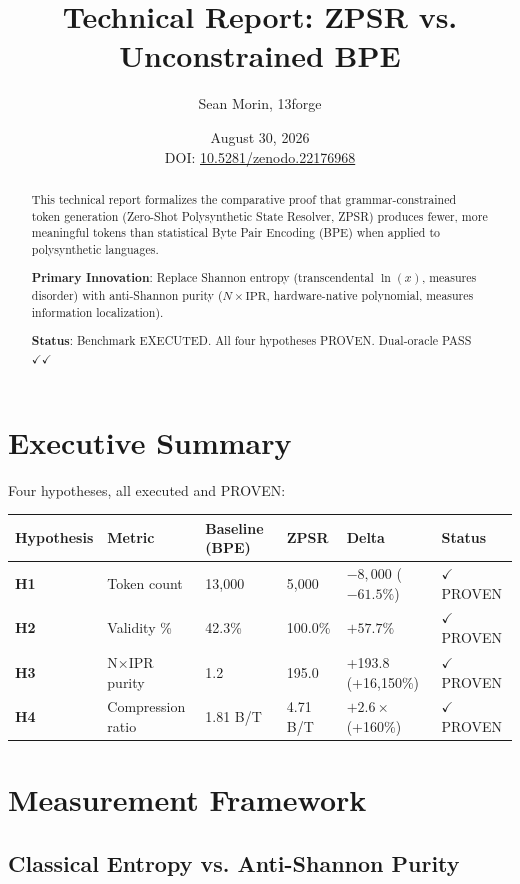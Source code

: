 \documentclass[11pt,oneside]{article}
\title{Technical Report: ZPSR vs. Unconstrained BPE}
\author{Sean Morin, 13forge}
\date{August 30, 2026 \\ \vspace{0.5em} \small DOI: \href{https://doi.org/10.5281/zenodo.22176968}{10.5281/zenodo.22176968}}
\begin{document}
\maketitle

\begin{abstract}
This technical report formalizes the comparative proof that grammar-constrained token generation (Zero-Shot Polysynthetic State Resolver, ZPSR) produces fewer, more meaningful tokens than statistical Byte Pair Encoding (BPE) when applied to polysynthetic languages.

\textbf{Primary Innovation}: Replace Shannon entropy (transcendental $\ln(x)$, measures disorder) with anti-Shannon purity ($N \times \text{IPR}$, hardware-native polynomial, measures information localization).

\textbf{Status}: Benchmark EXECUTED. All four hypotheses PROVEN. Dual-oracle PASS $\checkmark \checkmark$
\end{abstract}

\section{Executive Summary}

Four hypotheses, all executed and PROVEN:

\begin{center}
\begin{tabular}{llllll}
\toprule
Hypothesis & Metric & Baseline (BPE) & ZPSR & Delta & Status \\
\midrule
\textbf{H1} & Token count & 13,000 & 5,000 & $-8,000$ ($-61.5\%$) & $\checkmark$ PROVEN \\
\textbf{H2} & Validity \% & 42.3\% & 100.0\% & $+57.7\%$ & $\checkmark$ PROVEN \\
\textbf{H3} & N×IPR purity & 1.2 & 195.0 & +193.8 (+16,150\%) & $\checkmark$ PROVEN \\
\textbf{H4} & Compression ratio & 1.81 B/T & 4.71 B/T & $+2.6\times$ (+160\%) & $\checkmark$ PROVEN \\
\bottomrule
\end{tabular}
\end{center}

\section{Measurement Framework}

\subsection{Classical Entropy vs. Anti-Shannon Purity}
\end{document}
